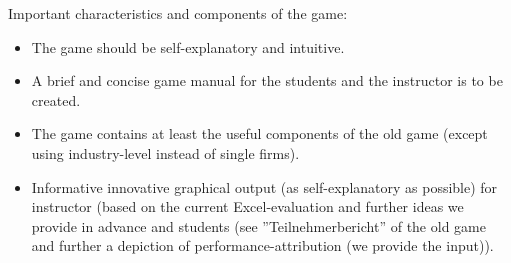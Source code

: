 Important characteristics and components of the game:
\begin{itemize}
  \item The game should be self-explanatory and intuitive.
  \item A brief and concise game manual for the students and the instructor is to be created.
  \item The game contains at least the useful components of the old game (except using industry-level instead of single firms).
  \item Informative innovative graphical output (as self-explanatory as possible) for instructor (based on the current Excel-evaluation and further ideas we provide in advance and students (see ''Teilnehmerbericht'' of the old game and further a depiction of performance-attribution (we provide the input)).
\end{itemize}
